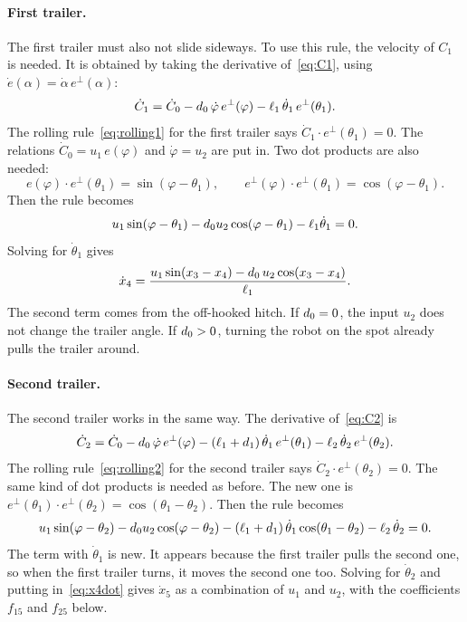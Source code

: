 \paragraph{First trailer.}
The first trailer must also not slide sideways. To use this rule, the
velocity of $C_1$ is needed. It is obtained by taking the derivative
of~\eqref{eq:C1}, using $\dot e(\alpha)=\dot\alpha\,e^\perp(\alpha)$:
\begin{equation}
  \dot C_1=\dot C_0-d_0\,\dot\varphi\,e^\perp(\varphi)
          -\ell_1\,\dot\theta_1\,e^\perp(\theta_1).
\end{equation}
The rolling rule~\eqref{eq:rolling1} for the first trailer says
$\dot C_1\cdot e^\perp(\theta_1)=0$. The relations $\dot C_0=u_1\,e(\varphi)$ and
$\dot\varphi=u_2$ are put in. Two dot products are also needed:
\begin{equation}
  e(\varphi)\cdot e^\perp(\theta_1)=\sin(\varphi-\theta_1),\qquad
  e^\perp(\varphi)\cdot e^\perp(\theta_1)=\cos(\varphi-\theta_1).
\end{equation}
Then the rule becomes
\begin{equation}
  u_1\sin(\varphi-\theta_1)-d_0 u_2\cos(\varphi-\theta_1)-\ell_1\dot\theta_1=0.
\end{equation}
Solving for $\dot\theta_1$ gives
\begin{equation}
  \dot x_4=\frac{u_1\sin(x_3-x_4)-d_0\,u_2\cos(x_3-x_4)}{\ell_1}.
  \label{eq:x4dot}
\end{equation}
The second term comes from the off-hooked hitch. If $d_0=0$, the input $u_2$
does not change the trailer angle. If $d_0>0$, turning the robot on the spot
already pulls the trailer around.

\paragraph{Second trailer.}
The second trailer works in the same way. The derivative
of~\eqref{eq:C2} is
\begin{equation}
  \dot C_2=\dot C_0-d_0\,\dot\varphi\,e^\perp(\varphi)
          -(\ell_1+d_1)\,\dot\theta_1\,e^\perp(\theta_1)
          -\ell_2\,\dot\theta_2\,e^\perp(\theta_2).
\end{equation}
The rolling rule~\eqref{eq:rolling2} for the second trailer says
$\dot C_2\cdot e^\perp(\theta_2)=0$. The same kind of dot products is needed
as before. The new one is
$e^\perp(\theta_1)\cdot e^\perp(\theta_2)=\cos(\theta_1-\theta_2)$. Then the rule
becomes
\begin{equation}
  u_1\sin(\varphi-\theta_2)-d_0 u_2\cos(\varphi-\theta_2)
  -(\ell_1+d_1)\,\dot\theta_1\cos(\theta_1-\theta_2)-\ell_2\,\dot\theta_2=0 .
\end{equation}
The term with $\dot\theta_1$ is new. It appears because the first trailer pulls
the second one, so when the first trailer turns, it moves the second one too. Solving
for $\dot\theta_2$ and putting in~\eqref{eq:x4dot} gives $\dot x_5$ as a
combination of $u_1$ and $u_2$, with the coefficients $f_{15}$ and $f_{25}$
below.

